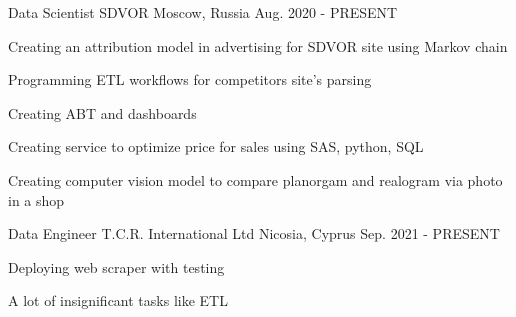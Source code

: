 

\begin{cventries}

  \cventry
    {Data Scientist} %
    {SDVOR} %
    {Moscow, Russia} %
    {Aug. 2020 - PRESENT} %
    {
      \begin{cvitems} %
        \item {Creating an attribution model in advertising for SDVOR site using Markov chain}
        \item {Programming ETL workflows for competitors site’s parsing}
        \item {Creating ABT and dashboards}
        \item {Creating service to optimize price for sales using SAS, python, SQL}
        \item {Creating computer vision model to compare planorgam and realogram via photo in a shop}
      \end{cvitems}
    }

  \cventry
    {Data Engineer} %
    {T.C.R. International Ltd} %
    {Nicosia, Cyprus} %
    {Sep. 2021 - PRESENT} %
    {
      \begin{cvitems} %
        \item {Deploying web scraper with testing}
	\item {A lot of insignificant tasks like ETL}
      \end{cvitems}
    }

\end{cventries}
